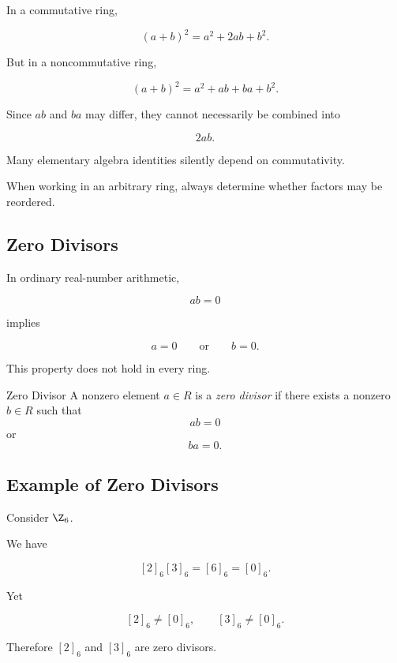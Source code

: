 In a commutative ring,

\[ (a+b)^2=a^2+2ab+b^2. \]

But in a noncommutative ring,

\[ (a+b)^2=a^2+ab+ba+b^2. \]

Since \(ab\) and \(ba\) may differ, they cannot necessarily be combined into

\[ 2ab. \]

\begin{warningbox}
Many elementary algebra identities silently depend on commutativity.

When working in an arbitrary ring, always determine whether factors may be
reordered.
\end{warningbox}

\subsection{Zero Divisors}
\label{subsec:zero-divisors}

In ordinary real-number arithmetic,

\[ ab=0 \]

implies

\[ a=0\qquad\text{or}\qquad b=0. \]

This property does not hold in every ring.

\begin{definitionbox}{Zero Divisor}
A nonzero element \(a\in R\) is a \emph{zero divisor} if there exists a
nonzero \(b\in R\) such that
\[ ab=0 \]
or
\[ ba=0. \]
\end{definitionbox}

\subsection{Example of Zero Divisors}
\label{subsec:zero-divisor-example}

Consider \(\Z_6\).

We have

\[ [2]_6[3]_6=[6]_6=[0]_6. \]

Yet

\[ [2]_6\neq[0]_6,\qquad[3]_6\neq[0]_6. \]

Therefore \([2]_6\) and \([3]_6\) are zero divisors.

